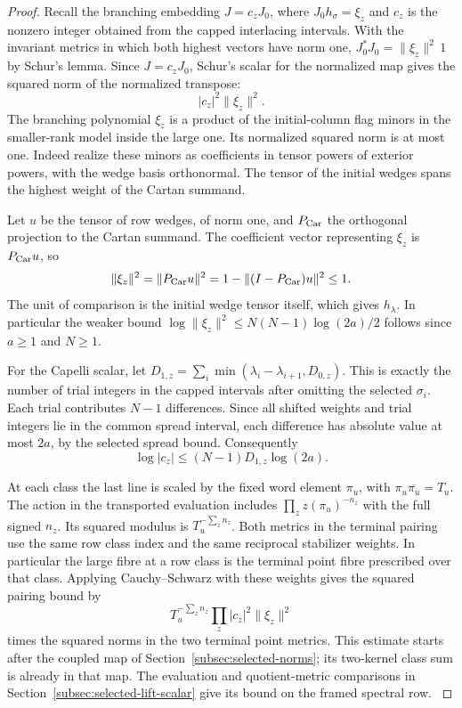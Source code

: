 \begin{proof}
Recall the branching embedding \(J=c_zJ_0\), where
\(J_0h_\sigma=\xi_z\) and \(c_z\) is the nonzero integer
obtained from the capped interlacing intervals. With the
invariant metrics in which both highest vectors have norm
one, \(J_0^*J_0=\|\xi_z\|^2\,1\) by Schur's lemma.
Since \(J=c_zJ_0\), Schur's scalar for the normalized map gives the squared norm of the normalized transpose:
\[
 |c_z|^2\|\xi_z\|^2 .
\] The branching polynomial \(\xi_z\)
is a product of the initial-column flag minors in the
smaller-rank model inside the large one. Its normalized
squared norm is at most one. Indeed realize these minors
as coefficients in tensor powers of exterior powers, with
the wedge basis orthonormal. The tensor of the initial
wedges spans the highest weight of the Cartan summand.

Let \(u\) be the tensor of row wedges, of norm one, and
\(P_{\rm Car}\) the orthogonal projection to the Cartan summand.
The coefficient vector representing \(\xi_z\) is \(P_{\rm Car}u\), so
\[
 \|\xi_z\|^2=\|P_{\rm Car}u\|^2
             =1-\|(I-P_{\rm Car})u\|^2\le1 .
\]
The unit of comparison is the initial wedge tensor
itself, which gives \(h_\lambda\). In particular the
weaker bound \(\log\|\xi_z\|^2\le N(N-1)\log(2a)/2\)
follows since \(a\ge1\) and \(N\ge1\).

For the Capelli scalar, let
\(D_{1,z}=\sum_i\min(\lambda_i-\lambda_{i+1},D_{0,z})\).
This is exactly the number of trial integers in the capped
intervals after omitting the selected \(\sigma_i\).
Each trial contributes \(N-1\) differences. Since all shifted
weights and trial integers lie in the common spread interval,
each difference has absolute value at most \(2a\), by the
selected spread bound. Consequently
\[
             \log |c_z|\le (N-1)D_{1,z}\log(2a).
\]
\label{cor:selected-terminal-height-1}

At each class the last line is scaled by the fixed word
element \(\pi_u\), with \(\pi_u\overline{\pi_u}=T_u\).
The action in the transported evaluation includes
\(\prod_z z(\pi_u)^{-n_z}\) with the full signed \(n_z\).
Its squared modulus is \(T_u^{-\sum_z n_z}\).
Both metrics in the terminal pairing use the same row
class index and the same reciprocal stabilizer weights.
In particular the large fibre at a row class is the
terminal point fibre prescribed over that class. Applying
Cauchy--Schwarz with these weights gives the squared
pairing bound by
\[
 T_u^{-\sum_z n_z}\prod_z |c_z|^2\|\xi_z\|^2
\]
times the squared norms in the two terminal point metrics.
This estimate starts after the coupled map of
Section~\ref{subsec:selected-norms}; its two-kernel
class sum is already in that map. The evaluation and
quotient-metric comparisons in
Section~\ref{subsec:selected-lift-scalar} give its
bound on the framed spectral row.
\label{cor:selected-terminal-height-2}


\end{proof}
